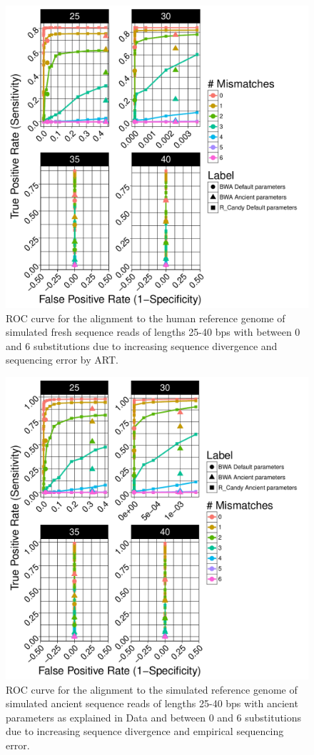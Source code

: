 \documentclass[11pt,a4paper]{report}
\begin{document}
\begin{figure}[H]
\centering
\includegraphics[width=12cm]{pictures/bROC_DS6_ART.pdf}
\caption{
ROC curve for the alignment to the human reference genome of simulated fresh 
sequence reads of lengths 25-40 bps with between 0 and 6 substitutions due 
to increasing sequence divergence and sequencing error by ART.
}
\label{DS6_ART}
\end{figure}



\begin{figure}[H]
\centering
\includegraphics[width=12cm]{pictures/bROC_DS1_ART.pdf}
\caption{
ROC curve for the alignment to the simulated reference genome of simulated ancient 
sequence reads of lengths 25-40 bps with ancient parameters as explained in Data 
and between 0 and 6 substitutions due to increasing sequence divergence and
empirical sequencing error.
}
\label{DS1_ART}
\end{figure}
\end{document}
